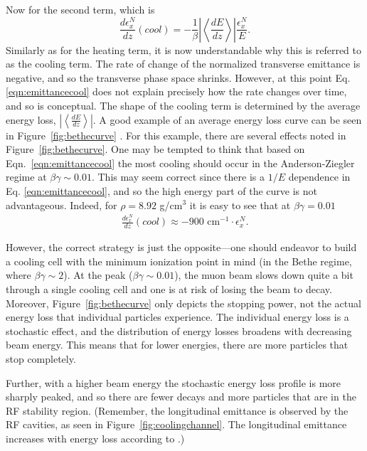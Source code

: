 Now for the second term, which is
\begin{equation}
\label{eqn:emittancecool}
\frac{d\epsilon_x^N}{dz}(cool)=-\frac{1}{\beta}\left| \left<\frac{dE}{dz}\right>\right| \frac{\epsilon_x^N}{E}.
\end{equation}
Similarly as for the heating term, it is now understandable why this is referred to as the cooling term. The rate of change of the normalized transverse emittance is negative, and so the transverse phase space shrinks. However, at this point Eq. \eqref{eqn:emittancecool} does not explain precisely how the rate changes over time, and so is conceptual. The shape of the cooling term is determined by the average energy loss, $\left|\left<\frac{dE}{dz}\right>\right|$. A good example of an average energy loss curve can be seen in Figure~\ref{fig:bethecurve} \cite{PDG}. For this example, there are several effects noted in Figure~\ref{fig:bethecurve}. One may be tempted to think that based on Eqn.~\eqref{eqn:emittancecool} the most cooling should occur in the Anderson-Ziegler regime at $\beta\gamma\sim0.01$. This may seem correct since there is a $1/E$ dependence in Eq. \eqref{eqn:emittancecool}, and so the high energy part of the curve is not advantageous. Indeed, for $\rho= 8.92$ g/cm$^3$ it is easy to see that at $\beta\gamma=0.01$ 
\begin{align*}
\frac{d\epsilon_x^N}{dz}(cool)\approx-900 \text{ cm}^{-1} \cdot \epsilon_x^N.
\end{align*}

However, the correct strategy is just the opposite---one should endeavor to build a cooling cell with the minimum ionization point in mind (in the Bethe regime, where $\beta\gamma\sim2$). At the peak ($\beta\gamma\sim0.01$), the muon beam slows down quite a bit through a single cooling cell and one is at risk of losing the beam to decay. Moreover, Figure~\ref{fig:bethecurve} only depicts the stopping power, not the actual energy loss that individual particles experience. The individual energy loss is a stochastic effect, and the distribution of energy losses broadens with decreasing beam energy. This means that for lower energies, there are more particles that stop completely. 
\iffalse



Further, with a higher beam energy the stochastic energy loss profile is more sharply peaked, and so there are fewer decays and more particles that are in the RF stability region. (Remember, the longitudinal emittance is observed by the RF cavities, as seen in Figure~\ref{fig:coolingchannel}. The longitudinal emittance increases with energy loss according to \cite{Fernow}.) 



